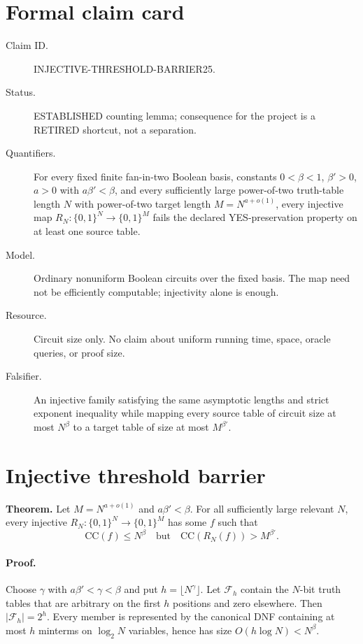 \documentclass[11pt]{article}
\begin{document}
\section*{Formal claim card}
\begin{description}
\item[Claim ID.] INJECTIVE-THRESHOLD-BARRIER25.
\item[Status.] ESTABLISHED counting lemma; consequence for the project is a
RETIRED shortcut, not a separation.
\item[Quantifiers.] For every fixed finite fan-in-two Boolean basis, constants
$0<\beta<1$, $\beta'>0$, $a>0$ with $a\beta'<\beta$, and every sufficiently
large power-of-two truth-table length $N$ with power-of-two target length
$M=N^{a+o(1)}$, every injective map $R_N:\{0,1\}^N\to\{0,1\}^M$ fails the
declared YES-preservation property on at least one source table.
\item[Model.] Ordinary nonuniform Boolean circuits over the fixed basis.
The map need not be efficiently computable; injectivity alone is enough.
\item[Resource.] Circuit size only.  No claim about uniform running time,
space, oracle queries, or proof size.
\item[Falsifier.] An injective family satisfying the same asymptotic lengths
and strict exponent inequality while mapping every source table of circuit
size at most $N^\beta$ to a target table of size at most $M^{\beta'}$.
\end{description}

\section*{Injective threshold barrier}
\textbf{Theorem.}
Let $M=N^{a+o(1)}$ and $a\beta'<\beta$.  For all sufficiently large relevant
$N$, every injective $R_N:\{0,1\}^N\to\{0,1\}^M$ has some $f$ such that
\[
  \mathrm{CC}(f)\leq N^\beta
  \quad\text{but}\quad
  \mathrm{CC}(R_N(f))>M^{\beta'}.
\]

\paragraph{Proof.}
Choose $\gamma$ with $a\beta'<\gamma<\beta$ and put
$h=\lfloor N^\gamma\rfloor$.  Let $\mathcal F_h$ contain the $N$-bit truth
tables that are arbitrary on the first $h$ positions and zero elsewhere.
Then $|\mathcal F_h|=2^h$.  Every member is represented by the canonical DNF
containing at most $h$ minterms on $\log_2N$ variables, hence has size
$O(h\log N)<N^\beta$.
\end{document}
